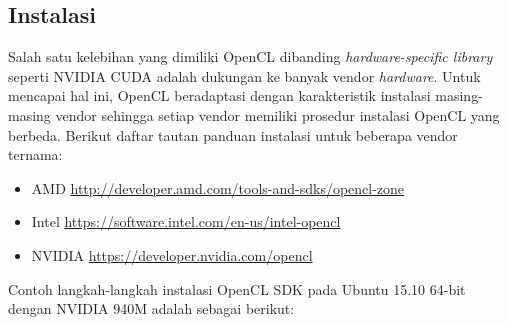 \subsection{Instalasi}

Salah satu kelebihan yang dimiliki OpenCL dibanding \textit{hardware-specific library} seperti NVIDIA CUDA adalah dukungan ke banyak vendor \textit{hardware}. Untuk mencapai hal ini, OpenCL beradaptasi dengan karakteristik instalasi masing-masing vendor sehingga setiap vendor memiliki prosedur instalasi OpenCL yang berbeda. Berikut daftar tautan panduan instalasi untuk beberapa vendor ternama:

\begin{itemize}
	\item AMD \url{http://developer.amd.com/tools-and-sdks/opencl-zone​}
	\item Intel \url{https://software.intel.com/en-us/intel-opencl​}
	\item NVIDIA \url{https://developer.nvidia.com/opencl}
\end{itemize}

Contoh langkah-langkah instalasi OpenCL SDK pada Ubuntu 15.10 64-bit dengan NVIDIA 940M \cite{opencl.howto} adalah sebagai berikut:

